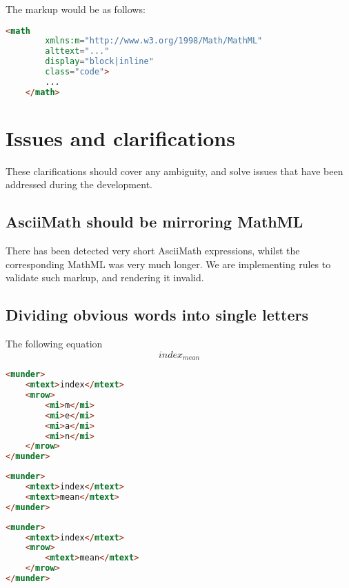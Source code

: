 \documentclass[english,a4paper,11pt]{article}
\begin{document}
\begin{eksempler}
The markup would be as follows:
\begin{lstlisting}[language=HTML]
	<math 
	    xmlns:m="http://www.w3.org/1998/Math/MathML"
	    alttext="..."
	    display="block|inline"
		class="code">
		...
	</math>
\end{lstlisting}
\end{eksempler}

\section{Issues and clarifications}

These clarifications should cover any ambiguity, and solve issues that have been addressed during the development.

\subsection{AsciiMath should be mirroring MathML}

There has been detected very short AsciiMath expressions, whilst the corresponding MathML was very much longer. We are implementing rules to validate such markup, and rendering it invalid.

\subsection{Dividing obvious words into single letters}
\begin{eksempler}
	The following equation
\begin{equation}
	index_{mean}
\end{equation}

\begin{lstlisting}[language=HTML, caption={\textbf{Invalid markup}}]
<munder>
	<mtext>index</mtext>
	<mrow>
		<mi>m</mi>
		<mi>e</mi>
		<mi>a</mi>
		<mi>n</mi>
	</mrow>
</munder>
\end{lstlisting}

\begin{lstlisting}[language=HTML, caption={Valid markup 1}]
<munder>
	<mtext>index</mtext>
	<mtext>mean</mtext>
</munder>
\end{lstlisting}

\begin{lstlisting}[language=HTML, caption={Valid markup 2}]
<munder>
	<mtext>index</mtext>
	<mrow>
		<mtext>mean</mtext>
	</mrow>
</munder>
\end{lstlisting}
\end{eksempler}
\end{document}
